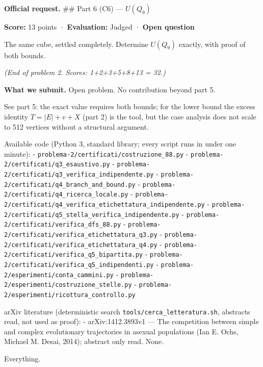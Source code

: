 
\textbf{Official request.} \#\# Part 6 (C6) --- \(U(Q_9)\)

\textbf{Score:} 13 points · \textbf{Evaluation:} Judged · \textbf{Open
question}

The same cube, settled completely. Determine \(U(Q_9)\) exactly, with
proof of both bounds.

\emph{(End of problem 2. Scores: 1+2+3+5+8+13 = 32.)}

\textbf{What we submit.} Open problem. No contribution beyond part 5.


See part 5: the exact value requires both bounds; for the lower bound
the excess identity \(T=|E|+v+X\) (part 2) is the tool, but the case
analysis does not scale to 512 vertices without a structural argument.


Available code (Python 3, standard library; every script runs in under
one minute): - \texttt{problema-2/certificati/costruzione\_88.py} -
\texttt{problema-2/certificati/q3\_esaustivo.py} -
\texttt{problema-2/certificati/q3\_verifica\_indipendente.py} -
\texttt{problema-2/certificati/q4\_branch\_and\_bound.py} -
\texttt{problema-2/certificati/q4\_ricerca\_locale.py} -
\texttt{problema-2/certificati/q4\_verifica\_etichettatura\_indipendente.py}
- \texttt{problema-2/certificati/q5\_stella\_verifica\_indipendente.py}
- \texttt{problema-2/certificati/verifica\_dfs\_88.py} -
\texttt{problema-2/certificati/verifica\_etichettatura\_q3.py} -
\texttt{problema-2/certificati/verifica\_etichettatura\_q4.py} -
\texttt{problema-2/certificati/verifica\_q5\_bipartita.py} -
\texttt{problema-2/certificati/verifica\_q5\_indipendenti.py} -
\texttt{problema-2/esperimenti/conta\_cammini.py} -
\texttt{problema-2/esperimenti/costruzione\_stelle.py} -
\texttt{problema-2/esperimenti/ricottura\_controllo.py}


arXiv literature (deterministic search
\texttt{tools/cerca\_letteratura.sh}, abstracts read, not used as
proof): - arXiv:1412.3893v1 --- The competition between simple and
complex evolutionary trajectories in asexual populations (Ian E. Ochs,
Michael M. Desai, 2014); abstract only read. None.


Everything.


